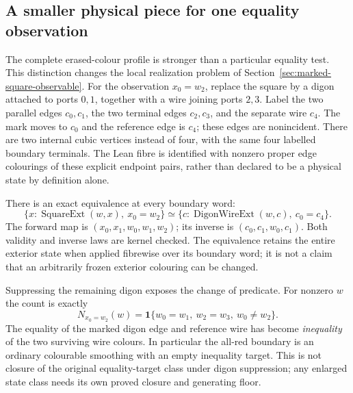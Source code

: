 \subsection{A smaller physical piece for one equality observation}
\label{sec:marked-square-boundary-reduction}

The complete erased-colour profile is stronger than a particular equality
test. This distinction changes the local realization problem of
Section~\ref{sec:marked-square-observable}. For the observation $x_0=w_2$,
replace the square by a digon attached to ports $0,1$, together with a wire
joining ports $2,3$. Label the two parallel edges $c_0,c_1$, the two
terminal edges $c_2,c_3$, and the separate wire $c_4$. The mark moves to
$c_0$ and the reference edge is $c_4$; these edges are nonincident.
There are two internal cubic vertices instead of four, with the same four
labelled boundary terminals. The Lean fibre is identified with nonzero
proper edge colourings of these explicit endpoint pairs, rather than
declared to be a physical state by definition alone.

There is an exact equivalence at every boundary word:
\[
 \{x:\operatorname{SquareExt}(w,x),\ x_0=w_2\}
 \simeq
 \{c:\operatorname{DigonWireExt}(w,c),\ c_0=c_4\}.
\]
The forward map is
$(x_0,x_1,w_0,w_1,w_2)$; its inverse is
$(c_0,c_1,w_0,c_1)$. Both validity and inverse laws are kernel checked.
The equivalence retains the entire exterior state when applied fibrewise
over its boundary word; it is not a claim that an arbitrarily frozen
exterior colouring can be changed.

Suppressing the remaining digon exposes the change of predicate. For
nonzero $w$ the count is exactly
\[
 N_{x_0=w_2}(w)=
 \mathbf 1\{w_0=w_1,\ w_2=w_3,\ w_0\ne w_2\}.
\]
The equality of the marked digon edge and reference wire has become
\emph{inequality} of the two surviving wire colours. In particular the
all-red boundary is an ordinary colourable smoothing with an empty
inequality target. This is not closure of the original equality-target
class under digon suppression; any enlarged state class needs its own
proved closure and generating floor.


